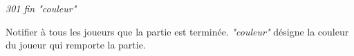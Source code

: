 \par

\textit{301 fin "couleur"}

Notifier à tous les joueurs que la partie est terminée. \textit{"couleur"} désigne la couleur du joueur qui remporte la partie. \\